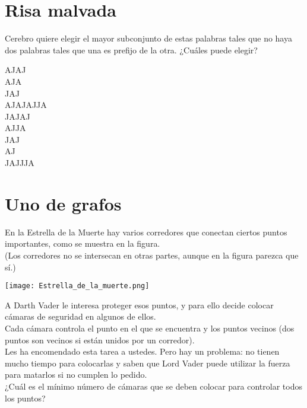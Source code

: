 \documentclass[12pt, a4paper]{article}
\begin{document}
\section{Risa malvada}
Cerebro quiere elegir el mayor subconjunto de estas palabras tales que no haya dos palabras tales que una es prefijo de la otra. ¿Cuáles puede elegir?
\begin{center}
AJAJ\\
AJA\\
JAJ\\
AJAJAJJA\\
JAJAJ\\
AJJA\\
JAJ\\
AJ\\
JAJJJA\\
\end{center}


\section{Uno de grafos}
En la Estrella de la Muerte hay varios corredores que conectan ciertos puntos importantes, como se muestra en la figura.\\
(Los corredores no se intersecan en otras partes, aunque en la figura parezca que sí.)
\begin{center}
\texttt{[image: Estrella\_de\_la\_muerte.png]}
\end{center}
A Darth Vader le interesa proteger esos puntos, y para ello decide colocar cámaras de seguridad en algunos de ellos.\\
Cada cámara controla el punto en el que se encuentra y los puntos vecinos (dos puntos son vecinos si están unidos por un corredor).\\
Les ha encomendado esta tarea a ustedes. Pero hay un problema: no tienen mucho tiempo para colocarlas y saben que Lord Vader puede utilizar la fuerza para matarlos si no cumplen lo pedido.\\
¿Cuál es el mínimo número de cámaras que se deben colocar para controlar todos los puntos?


\end{document}
